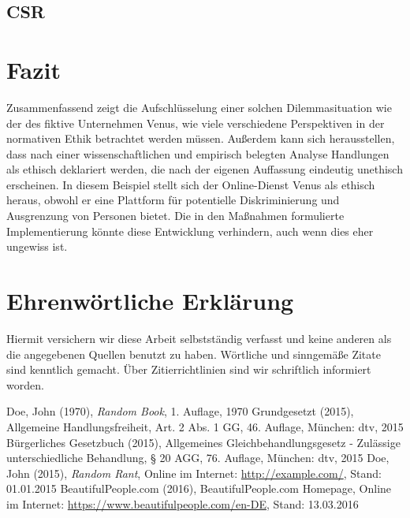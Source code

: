 \documentclass[a4paper, fontsize=12pt, parskip=full, toc=bibliographynumbered]{scrreprt}
\begin{document}
\section{CSR}

\chapter{Fazit}

Zusammenfassend zeigt die Aufschlüsselung einer solchen Dilemmasituation wie der des fiktive Unternehmen Venus, wie viele verschiedene Perspektiven in der normativen Ethik betrachtet werden müssen. Außerdem kann sich herausstellen, dass nach einer wissenschaftlichen und empirisch belegten Analyse Handlungen als ethisch deklariert werden, die nach der eigenen Auffassung eindeutig unethisch erscheinen. In diesem Beispiel stellt sich der Online-Dienst Venus als ethisch heraus, obwohl er eine Plattform für potentielle Diskriminierung und Ausgrenzung von Personen bietet. Die in den Maßnahmen formulierte Implementierung könnte diese Entwicklung verhindern, auch wenn dies eher ungewiss ist. 

\chapter{Ehrenwörtliche Erklärung}

Hiermit versichern wir diese Arbeit selbstständig verfasst und keine
anderen als die angegebenen Quellen benutzt zu haben.  Wörtliche und
sinngemäße Zitate sind kenntlich gemacht.  Über Zitierrichtlinien
sind wir schriftlich informiert worden.

\renewcommand{\bibname}{Quellenverzeichnis}
\begin{thebibliography}{9}
 Doe, John (1970), \emph{Random Book}, 1. Auflage, 1970
 Grundgesetzt (2015), Allgemeine Handlungsfreiheit, Art. 2 Abs. 1 GG, 46. Auflage, München: dtv, 2015
 Bürgerliches Gesetzbuch (2015), Allgemeines Gleichbehandlungsgesetz - Zulässige unterschiedliche Behandlung, § 20 AGG, 76. Auflage, München: dtv,  2015
 Doe, John (2015), \emph{Random Rant}, Online im
  Internet: \url{http://example.com/}, Stand: 01.01.2015
 BeautifulPeople.com (2016), BeautifulPeople.com Homepage, Online im Internet: \url{https://www.beautifulpeople.com/en-DE}, Stand: 13.03.2016
\end{thebibliography}
\end{document}
